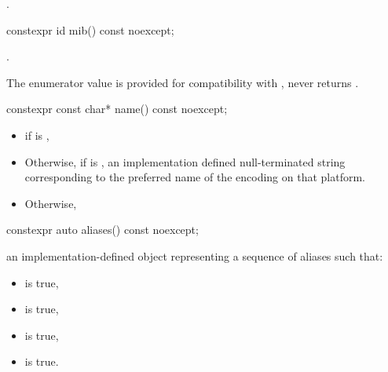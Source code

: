 \documentclass{wg21}
\begin{document}
\begin{addedblock}
\begin{itemdescr}
    \ensures {}.
\end{itemdescr}





\begin{itemdecl}
constexpr id mib() const noexcept;
\end{itemdecl}

\begin{itemdescr}
\returns {}.

\begin{note}
	The enumerator value  is provided for compatibility with \cite{rfc3808},
	 never returns .
\end{note}

\end{itemdescr}

\begin{itemdecl}
constexpr const char* name() const noexcept;
\end{itemdecl}
\begin{itemdescr}
\returns 

\begin{itemize}
    \item {} if  is ,
    \item Otherwise, if  is , an implementation defined null-terminated string corresponding to the preferred name of the encoding on that platform.
    \item Otherwise, 
\end{itemize}
\end{itemdescr}


\begin{itemdecl}
constexpr auto aliases() const noexcept;
\end{itemdecl}

\begin{itemdescr}
\returns an implementation-defined object  representing a sequence of aliases such that:
\begin{itemize}
    \item {} is true,
    \item {} is true,
    \item {} is true,
    \item {} is true.
\end{itemize}


\end{itemdescr}
\end{addedblock}
\end{document}

